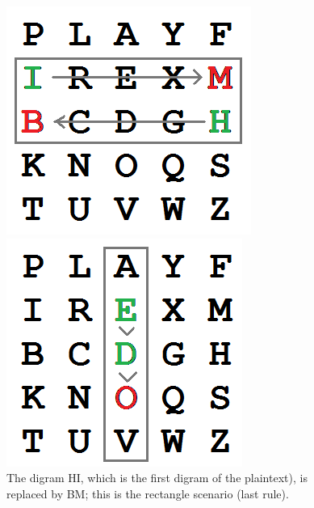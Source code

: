 \documentclass[Lau,binding=0.6cm,oneside]{sapthesis}
\begin{document}
\begin{figure}[H]
  \includegraphics[width=\linewidth]{playfair_1}
  \caption{The digram HI, which is the first digram of the plaintext), is replaced by BM; this is the rectangle scenario (last rule).}
\endminipage\hfill
{}
  \includegraphics[width=\linewidth]{playfair_2}

\end{figure}
\end{document}
